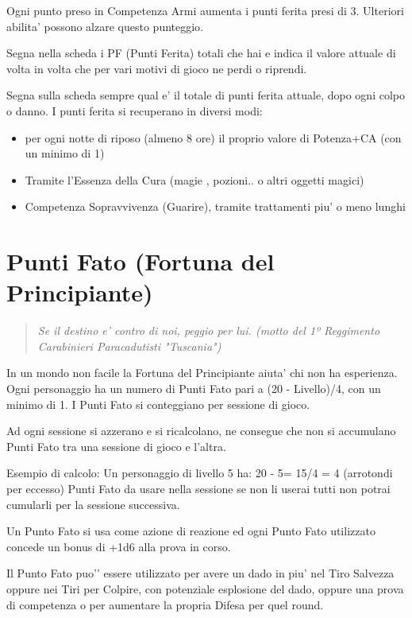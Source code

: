 \documentclass[a4paper,11pt,twoside,openany]{book}
\begin{document}
Ogni punto preso in Competenza Armi aumenta i punti ferita presi di 3. Ulteriori abilita’ possono alzare questo punteggio.

Segna nella scheda i PF (Punti Ferita) totali che hai e indica il valore attuale di volta in volta che per vari motivi di gioco ne perdi o riprendi.

Segna sulla scheda sempre qual e’ il totale di punti ferita attuale, dopo ogni colpo o danno.
I punti ferita si recuperano in diversi modi:

\begin{itemize}
\item 
per ogni notte di riposo (almeno 8 ore) il proprio valore di Potenza+CA (con un minimo di 1) 
\item
 Tramite l'Essenza della Cura (magie , pozioni.. o altri oggetti magici) 
\item 
Competenza Sopravvivenza (Guarire), tramite trattamenti piu' o meno lunghi 
\end{itemize}


\section{Punti Fato (Fortuna del Principiante)}
\begin{quote}\textit{Se il destino e' contro di noi, peggio per lui. (motto del 1º Reggimento Carabinieri Paracadutisti "Tuscania")
}\end{quote}

In un mondo non facile la Fortuna del Principiante aiuta’ chi non ha esperienza.
Ogni personaggio ha un numero di Punti Fato pari a (20 - Livello)/4, con un minimo di 1. I Punti Fato si conteggiano per sessione di gioco. 

Ad ogni sessione si azzerano e si ricalcolano, ne consegue che non si accumulano Punti Fato tra una sessione di gioco e l’altra.

Esempio di calcolo:
Un personaggio di livello 5 ha: 20 - 5= 15/4 = 4 (arrotondi per eccesso) Punti Fato da usare nella sessione se non li userai tutti non potrai cumularli per la sessione successiva.

Un Punto Fato si usa come azione di reazione ed ogni Punto Fato utilizzato concede un bonus di +1d6 alla prova in corso. 

Il Punto Fato puo'’ essere utilizzato per avere un dado in piu' nel Tiro Salvezza oppure nei Tiri per Colpire, con potenziale esplosione del dado, oppure una prova di competenza o per aumentare la propria Difesa per quel round.
\end{document}
